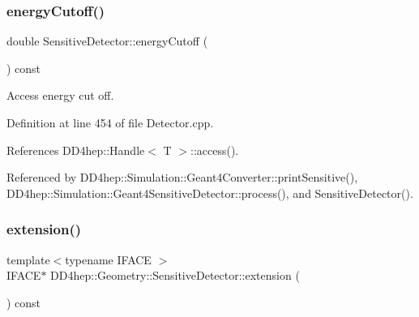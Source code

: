 \hypertarget{class_d_d4hep_1_1_geometry_1_1_sensitive_detector_a2479d4a77da32c469715c4c2f491b345}{}\label{class_d_d4hep_1_1_geometry_1_1_sensitive_detector_a2479d4a77da32c469715c4c2f491b345} 
\subsubsection{\texorpdfstring{energy\+Cutoff()}{energyCutoff()}}
{\footnotesize\ttfamily double Sensitive\+Detector\+::energy\+Cutoff (\begin{DoxyParamCaption}{ }\end{DoxyParamCaption}) const}



Access energy cut off. 



Definition at line 454 of file Detector.\+cpp.



References D\+D4hep\+::\+Handle$<$ T $>$\+::access().



Referenced by D\+D4hep\+::\+Simulation\+::\+Geant4\+Converter\+::print\+Sensitive(), D\+D4hep\+::\+Simulation\+::\+Geant4\+Sensitive\+Detector\+::process(), and Sensitive\+Detector().

\hypertarget{class_d_d4hep_1_1_geometry_1_1_sensitive_detector_ad00fc058ee31292620530e73deb36abc}{}\label{class_d_d4hep_1_1_geometry_1_1_sensitive_detector_ad00fc058ee31292620530e73deb36abc} 
\subsubsection{\texorpdfstring{extension()}{extension()}}
{\footnotesize\ttfamily template$<$typename I\+F\+A\+CE $>$ \\
I\+F\+A\+CE$\ast$ D\+D4hep\+::\+Geometry\+::\+Sensitive\+Detector\+::extension (\begin{DoxyParamCaption}{ }\end{DoxyParamCaption}) const\hspace{0.3cm}{\ttfamily [inline]}}



